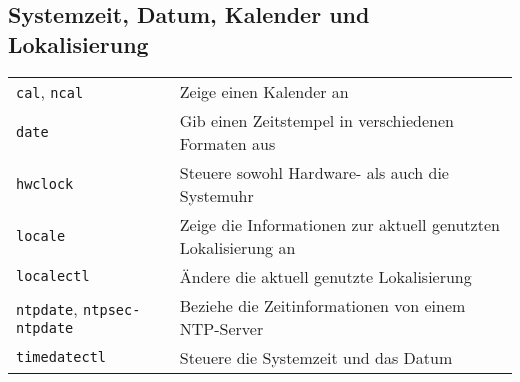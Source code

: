 \documentclass[10pt,a4paper]{article}
\begin{document}
\begin{multicols}{2}   

\section{Systemzeit, Datum, Kalender und Lokalisierung}
\begin{tabular}{ p{2.5cm} p{8.5cm} }
  \hline
  \texttt{cal}, \texttt{ncal} & Zeige einen Kalender an\\
  \texttt{date} & Gib einen Zeitstempel in verschiedenen Formaten aus \\
  \texttt{hwclock} & Steuere sowohl Hardware- als auch die Systemuhr\\
  \texttt{locale} & Zeige die Informationen zur aktuell genutzten Lokalisierung an \\
  \texttt{localectl} & Ändere die aktuell genutzte Lokalisierung \\
  \texttt{ntpdate}, \texttt{ntpsec-ntpdate} & Beziehe die Zeitinformationen von einem NTP-Server \\
  \texttt{timedatectl} & Steuere die Systemzeit und das Datum \\
  \hline
\end{tabular}


~ \\
\vfill


\end{multicols}
\end{document}
